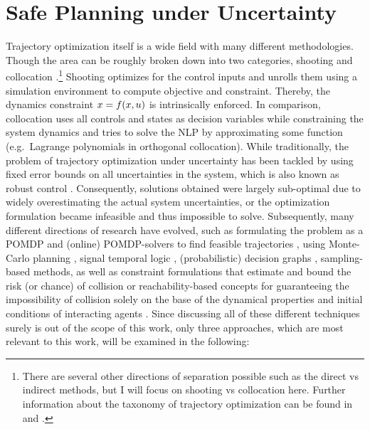 \section{Safe Planning under Uncertainty}
\label{text:related/uncertainty}
Trajectory optimization itself is a wide field with many different methodologies. Though the area can be roughly broken down into two categories, shooting and collocation \cite{Kelly2017}.\footnote{There are several other directions of separation possible such as the direct vs indirect methods, but I will focus on shooting vs collocation here. Further information about the taxonomy of trajectory optimization can be found in \cite{Kelly2017}  and \cite{Chai2020}.} Shooting optimizes for the control inputs and unrolls them using a simulation environment to compute objective and constraint. Thereby, the dynamics constraint $x = f(x, u)$ is intrinsically enforced. In comparison, collocation uses all controls and states as decision variables while constraining the system dynamics and tries to solve the \ac{NLP} by approximating some function (e.g.\ Lagrange polynomials in orthogonal collocation).
\newline
While traditionally, the problem of trajectory optimization under uncertainty has been tackled by using fixed error bounds on all uncertainties in the system, which is also known as robust control \cite{Bemporad1999}. Consequently, solutions obtained were largely sub-optimal due to widely overestimating the actual system uncertainties, or the optimization formulation became infeasible and thus impossible to solve. Subsequently, many different directions of research have evolved, such as formulating the problem as a \ac{POMDP} and (online) \ac{POMDP}-solvers to find feasible trajectories \cite{Chen2016}, using Monte-Carlo planning \cite{Janson2015} \cite{Silver2010}, signal temporal logic \cite{Sadigh2016}, (probabilistic) decision graphs \cite{Koenig1994}, sampling-based methods, as well as constraint formulations that estimate and bound the risk (or chance) of collision \cite{Ono2015}\cite{Lew2019}\cite{Chow2015a}\cite{Chow2015}\cite{Ono2012}\cite{Ludersa}\cite{Luders2011}\cite{Otte2014} or reachability-based concepts for guaranteeing the impossibility of collision solely on the base of the dynamical properties and initial conditions of interacting agents \cite{Leung2020}\cite{Dhinakaran2017}\cite{Margellos2009}\cite{Chen2017b} \cite{Althoff2009}\cite{Althoff2010}. Since discussing all of these different techniques surely is out of the scope of this work, only three approaches, which are most relevant to this work, will be examined in the following:

